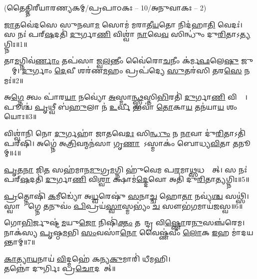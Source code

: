 
\vspace{-1ex}
\centerline{\normalsize (𑌤𑍈𑌤𑍍𑌤𑌿𑌰𑍀𑌯𑌾𑌰𑌣𑍍𑌯𑌕𑌮𑍍/𑌪𑍍𑌰𑌪𑌾𑌠𑌕𑌃 – 10/𑌅𑌨𑍁𑌵𑌾𑌕𑌃 – 2)}

\ul{𑌜𑌾}𑌤𑌵𑍇॑𑌦𑌸𑍇 𑌸𑍁𑌨𑌵𑌾\ul{𑌮} 𑌸𑍋𑌮॑ 𑌮𑌰𑌾𑌤𑍀\ul{𑌯}𑌤𑍋 𑌨𑌿𑌦॑𑌹𑌾\ul{𑌤𑌿} 𑌵𑍇𑌦𑌃॑।
𑌸 𑌨𑌃॑ 𑌪𑌰𑍍‌\ul{𑌷}𑌦𑌤𑌿॑ \ul{𑌦𑍁}𑌰𑍍𑌗𑌾\ul{𑌣𑌿} 𑌵𑌿𑌶𑍍𑌵𑌾॑ \ul{𑌨𑌾}𑌵𑍇\ul{𑌵} 𑌸𑌿𑌨𑍍𑌧𑍁𑌂॑ 𑌦𑍁\ul{𑌰𑌿}𑌤𑌾𑌽\ul{𑌤𑍍𑌯}𑌗𑍍𑌨𑌿𑌃॥1॥

𑌤𑌾\ul{𑌮}𑌗𑍍𑌨𑌿𑌵॑\ul{𑌰𑍍𑌣𑌾𑌂} 𑌤𑌪॑𑌸𑌾 𑌜𑍍𑌵\ul{𑌲}𑌨𑍍𑌤𑍀𑌂 𑌵𑍈॑𑌰𑍋\ul{𑌚}𑌨𑍀𑌂 𑌕॑𑌰𑍍𑌮\ul{𑌫}𑌲𑍇\ul{𑌷𑍁} 𑌜𑍁𑌷𑍍𑌟𑌾᳚𑌮𑍍।
\ul{𑌦𑍁}𑌰𑍍𑌗𑌾𑌂 \ul{𑌦𑍇}𑌵𑍀 𑌶𑌰॑𑌣\ul{𑌮}𑌹𑌂 𑌪𑍍𑌰𑌪॑𑌦𑍍𑌯𑍇 \ul{𑌸𑍁}𑌤𑌰॑𑌸𑌿 𑌤𑌰\ul{𑌸𑍇} 𑌨𑌮𑌃॑॥2॥

𑌅\ul{𑌗𑍍𑌨𑍇} 𑌤𑍍𑌵𑌂 𑌪𑌾॑𑌰\ul{𑌯𑌾} 𑌨𑌵𑍍𑌯𑍋॑ \ul{𑌅}𑌸𑍍𑌮𑌾\ul{𑌨𑍍𑌥𑍍𑌸𑍍𑌵}𑌸𑍍𑌤𑌿\ul{𑌭𑌿}𑌰𑌤𑌿॑ \ul{𑌦𑍁}𑌰𑍍𑌗𑌾\ul{𑌣𑌿} 𑌵𑌿𑌶𑍍𑌵𑌾᳚।
𑌪𑍂𑌶𑍍𑌚॑ \ul{𑌪𑍃}𑌥𑍍𑌵𑍀 𑌬॑\ul{𑌹𑍁}𑌲𑌾 𑌨॑ \ul{𑌉}𑌰𑍍𑌵𑍀 𑌭𑌵𑌾॑ \ul{𑌤𑍋}𑌕𑌾\ul{𑌯} 𑌤𑌨॑𑌯𑌾\ul{𑌯} 𑌶𑌂 𑌯𑍋𑌃॥3॥

𑌵𑌿𑌶𑍍𑌵𑌾॑𑌨𑌿 𑌨𑍋 \ul{𑌦𑍁}𑌰𑍍𑌗𑌹𑌾॑ 𑌜𑌾𑌤𑌵𑍇\ul{𑌦𑌃} 𑌸𑌿\ul{𑌨𑍍𑌧𑍁𑌂} 𑌨 \ul{𑌨𑌾}𑌵𑌾 𑌦𑍁॑\ul{𑌰𑌿}𑌤𑌾𑌽𑌤𑌿॑𑌪𑌰𑍍‌\mbox{}𑌷𑌿।
𑌅𑌗𑍍𑌨𑍇॑ 𑌅\ul{𑌤𑍍𑌰𑌿}𑌵𑌨𑍍𑌮𑌨॑𑌸𑌾 𑌗𑍃\ul{𑌣𑌾}𑌨𑍋᳚𑌽𑌸𑍍𑌮𑌾𑌕𑌂॑ 𑌬𑍋𑌧𑍍𑌯\ul{𑌵𑌿}𑌤𑌾 \ul{𑌤}𑌨𑍂𑌨𑌾᳚𑌮𑍍॥4॥

\ul{𑌪𑍃}\ul{𑌤}\ul{𑌨𑌾} 𑌜𑌿\ul{𑌤}\ul{} 𑌸𑌹॑𑌮𑌾𑌨\ul{𑌮𑍁}𑌗𑍍𑌰\ul{𑌮}𑌗𑍍𑌨𑌿 𑌹𑍁॑𑌵𑍇𑌮 𑌪\ul{𑌰}𑌮𑌾\ul{𑌥𑍍𑌸}𑌧𑌸𑍍𑌥𑌾᳚𑌤𑍍।
𑌸 𑌨𑌃॑ 𑌪𑌰𑍍‌\ul{𑌷}𑌦𑌤𑌿॑ \ul{𑌦𑍁}𑌰𑍍𑌗𑌾\ul{𑌣𑌿} 𑌵𑌿\ul{𑌶𑍍𑌵𑌾} 𑌕𑍍𑌷𑌾𑌮॑\ul{𑌦𑍍𑌦𑍇}𑌵𑍋 𑌅𑌤𑌿॑ 𑌦𑍁\ul{𑌰𑌿}𑌤𑌾\ul{𑌤𑍍𑌯}𑌗𑍍𑌨𑌿𑌃॥5॥

\ul{𑌪𑍍𑌰}𑌤𑍍𑌨𑍋𑌷𑌿॑ \ul{𑌕}𑌮𑍀𑌡𑍍𑌯𑍋॑ 𑌅\ul{𑌧𑍍𑌵}𑌰𑍇𑌷𑍁॑ \ul{𑌸}𑌨𑌾\ul{𑌚𑍍𑌚} 𑌹𑍋\ul{𑌤𑌾} 𑌨𑌵𑍍𑌯॑\ul{𑌶𑍍𑌚} 𑌸𑌥𑍍𑌸𑌿॑।
𑌸𑍍𑌵𑌾𑌞𑍍𑌚𑌾᳚𑌗𑍍𑌨𑍇 \ul{𑌤}𑌨𑍁𑌵𑌂॑ \ul{𑌪𑌿}𑌪𑍍𑌰𑌯॑\ul{𑌸𑍍𑌵𑌾}𑌸𑍍𑌮𑌭𑍍𑌯𑌂॑ \ul{𑌚} 𑌸𑍗𑌭॑\ul{𑌗}𑌮𑌾𑌯॑𑌜𑌸𑍍𑌵॥6॥

𑌗𑍋\ul{𑌭𑌿}𑌰𑍍𑌜𑍁𑌷𑍍𑌟॑\ul{𑌮}𑌯𑍁\ul{𑌜𑍋} 𑌨𑌿𑌷𑌿॑\ul{𑌕𑍍𑌤𑌂} 𑌤𑌵𑍇᳚𑌨𑍍𑌦𑍍𑌰 𑌵𑌿\ul{𑌷𑍍𑌣𑍋}𑌰\ul{𑌨𑍁}𑌸𑌞𑍍𑌚॑𑌰𑍇𑌮।
𑌨𑌾𑌕॑𑌸𑍍𑌯 \ul{𑌪𑍃}𑌷𑍍𑌠\ul{𑌮}𑌭𑌿 \ul{𑌸𑌂}𑌵𑌸𑌾॑\ul{𑌨𑍋} 𑌵𑍈𑌷𑍍𑌣॑𑌵𑍀𑌂 \ul{𑌲𑍋}𑌕 \ul{𑌇}𑌹 𑌮𑌾॑𑌦𑌯𑌨𑍍𑌤𑌾𑌮𑍍॥7॥
\vspace{-0.5ex}
\begin{center}
\ul{𑌕𑌾}\ul{𑌤𑍍𑌯𑌾}\ul{𑌯}𑌨𑌾𑌯॑ \ul{𑌵𑌿}𑌦𑍍𑌮𑌹𑍇॑ 𑌕𑌨𑍍𑌯\ul{𑌕𑍁}𑌮𑌾𑌰𑌿॑ 𑌧𑍀𑌮𑌹𑌿।\\
 𑌤𑌨𑍍𑌨𑍋॑ 𑌦𑍁𑌰𑍍𑌗𑌿𑌃 𑌪𑍍𑌰\ul{𑌚𑍋}𑌦𑌯𑌾᳚𑌤𑍍॥ 
\end{center}
